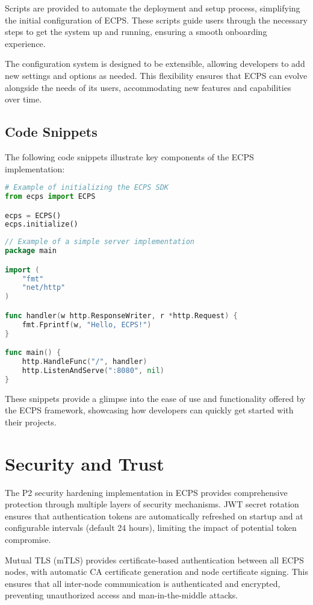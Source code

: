 \documentclass[12pt]{article}
\begin{document}
Scripts are provided to automate the deployment and setup process, simplifying the initial configuration of ECPS. These scripts guide users through the necessary steps to get the system up and running, ensuring a smooth onboarding experience.

The configuration system is designed to be extensible, allowing developers to add new settings and options as needed. This flexibility ensures that ECPS can evolve alongside the needs of its users, accommodating new features and capabilities over time.

\subsection{Code Snippets}
The following code snippets illustrate key components of the ECPS implementation:

\begin{lstlisting}[language=Python]
# Example of initializing the ECPS SDK
from ecps import ECPS

ecps = ECPS()
ecps.initialize()
\end{lstlisting}

\begin{lstlisting}[language=Go]
// Example of a simple server implementation
package main

import (
    "fmt"
    "net/http"
)

func handler(w http.ResponseWriter, r *http.Request) {
    fmt.Fprintf(w, "Hello, ECPS!")
}

func main() {
    http.HandleFunc("/", handler)
    http.ListenAndServe(":8080", nil)
}
\end{lstlisting}

These snippets provide a glimpse into the ease of use and functionality offered by the ECPS framework, showcasing how developers can quickly get started with their projects.

\section{Security and Trust}
The P2 security hardening implementation in ECPS provides comprehensive protection through multiple layers of security mechanisms. JWT secret rotation ensures that authentication tokens are automatically refreshed on startup and at configurable intervals (default 24 hours), limiting the impact of potential token compromise.

Mutual TLS (mTLS) provides certificate-based authentication between all ECPS nodes, with automatic CA certificate generation and node certificate signing. This ensures that all inter-node communication is authenticated and encrypted, preventing unauthorized access and man-in-the-middle attacks.
\end{document}
